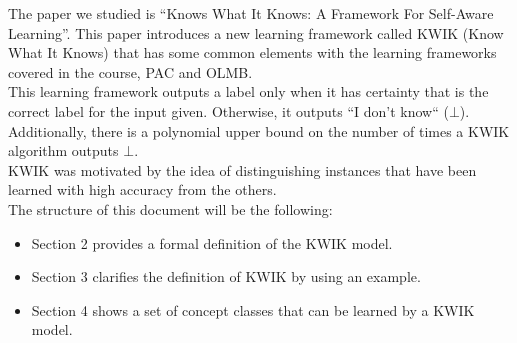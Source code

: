 The paper we studied is ``Knows What It Knows: A Framework For Self-Aware Learning''\cite{KWIK}.
This paper introduces a new learning framework called KWIK (Know What It Knows) that has some common elements with 
the learning frameworks covered in the course, PAC and OLMB.\\

This learning framework outputs a label only when it has certainty that is the correct label for the input given. Otherwise, it outputs
``I don't know`` ($\bot$). Additionally, there is a polynomial upper bound on the number of times a KWIK algorithm outputs $\bot$.\\

KWIK was motivated by the idea of distinguishing instances that have been learned with high accuracy from the others. \\

The structure of this document will be the following:
\begin{itemize}
  \item Section 2 provides a formal definition of the KWIK model. 
  \item Section 3 clarifies the definition of KWIK by using an example.
  \item Section 4 shows a set of concept classes that can be learned by a KWIK model.
\end{itemize}
